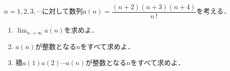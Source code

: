 \documentclass[../../main.tex]{subfiles}
\begin{document}
$n=1,2,3,\cdots$に対して数列$\displaystyle a(n)=\dfrac{(n+2)(n+3)(n+4)}{n \, !}$を考える．
\begin{enumerate}
  \item $\displaystyle\lim_{n\to\infty}a(n)$を求めよ．
  \item $a(n)$が整数となる$n$をすべて求めよ．
  \item 積$a(1) a(2) \cdots a(n)$が整数となる$n$をすべて求めよ．
\end{enumerate}
\end{document}
